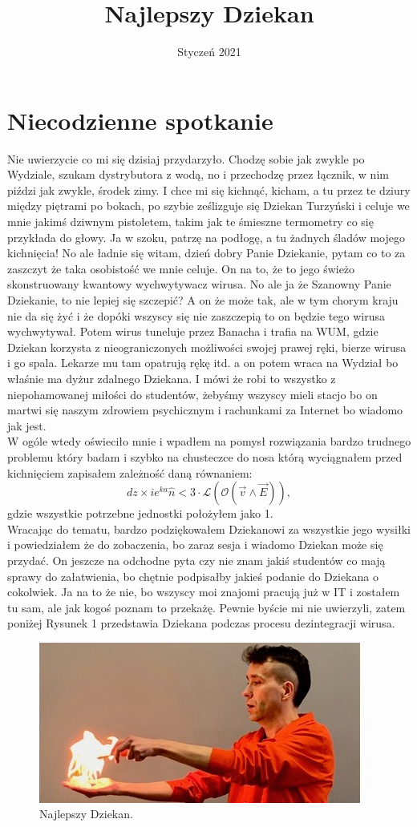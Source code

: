 \documentclass{article}
\title{Najlepszy Dziekan}
\date{Styczeń 2021}
\begin{document}
\section{Niecodzienne spotkanie}
\indent Nie uwierzycie co mi się dzisiaj przydarzyło. Chodzę sobie jak zwykle po Wydziale, szukam dystrybutora z wodą, no i przechodzę przez łącznik, w nim piździ jak zwykle, środek zimy. I chce mi się kichnąć, kicham, a tu przez te dziury między piętrami po bokach, po szybie ześlizguje się Dziekan Turzyński i celuje we mnie jakimś dziwnym pistoletem, takim jak te śmieszne termometry co się przykłada do głowy. Ja w szoku, patrzę na podłogę, a tu żadnych śladów mojego kichnięcia! No ale ładnie się witam, dzień dobry Panie Dziekanie, pytam co to za zaszczyt że taka osobistość we mnie celuje. On na to, że to jego świeżo skonstruowany kwantowy wychwytywacz wirusa. No ale ja że Szanowny Panie Dziekanie, to nie lepiej się szczepić? A on że może tak, ale w tym chorym kraju nie da się żyć i że dopóki wszyscy się nie zaszczepią to on będzie tego wirusa wychwytywał. Potem wirus tuneluje przez Banacha i trafia na WUM, gdzie Dziekan korzysta z nieograniczonych możliwości swojej prawej ręki, bierze wirusa i go spala. Lekarze mu tam opatrują rękę itd. a on potem wraca na Wydział bo właśnie ma dyżur zdalnego Dziekana. I mówi że robi to wszystko z niepohamowanej miłości do studentów, żebyśmy wszyscy mieli stacjo bo on martwi się naszym zdrowiem psychicznym i rachunkami za Internet bo wiadomo jak jest. \\
\indent W ogóle wtedy oświeciło mnie i wpadłem na pomysł rozwiązania bardzo trudnego problemu który badam i szybko na chusteczce do nosa którą wyciągnałem przed kichnięciem zapisałem zależność daną równaniem:
\begin{equation}
    dz\times ie^{ka}\hat{n}<3\cdot \mathcal{L}(\mathcal{O}(\Vec{v}\wedge \Vec{E})),
    \label{Eq1}
\end{equation}
gdzie wszystkie potrzebne jednostki położyłem jako 1.\\	
\indent Wracając do tematu, bardzo podziękowałem Dziekanowi za wszystkie jego wysiłki i powiedziałem że do zobaczenia, bo zaraz sesja i wiadomo Dziekan może się przydać. On jeszcze na odchodne pyta czy nie znam jakiś studentów co mają sprawy do załatwienia, bo chętnie podpisałby jakieś podanie do Dziekana o cokolwiek. Ja na to że nie, bo wszyscy moi znajomi pracują już w IT i zostałem tu sam, ale jak kogoś poznam to przekażę. Pewnie byście mi nie uwierzyli, zatem poniżej Rysunek 1 przedstawia Dziekana podczas procesu dezintegracji wirusa.
\flushleft
\begin{figure}[!h]
\centering
\includegraphics[width=.6\textwidth]{dziekan.jpg}
\caption{Najlepszy Dziekan.}
\label{dziekan}
\end{figure}
\end{document}
